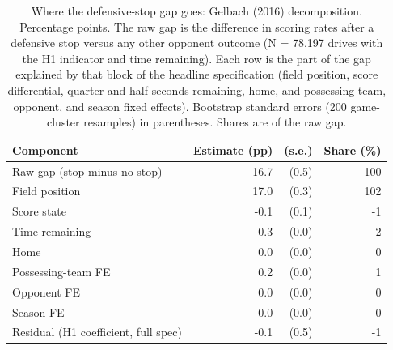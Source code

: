 \begin{table}[htbp]
\centering
\caption{\label{tab:decomp} Where the defensive-stop gap goes: Gelbach (2016) decomposition. Percentage points. The raw gap is the difference in scoring rates after a defensive stop versus any other opponent outcome (N = 78,197 drives with the H1 indicator and time remaining). Each row is the part of the gap explained by that block of the headline specification (field position, score differential, quarter and half-seconds remaining, home, and possessing-team, opponent, and season fixed effects). Bootstrap standard errors (200 game-cluster resamples) in parentheses. Shares are of the raw gap.}
\begin{tabular}{lrrr}
\toprule
Component & Estimate (pp) & (s.e.) & Share (\%) \\
\midrule
Raw gap (stop minus no stop) & 16.7 & (0.5) & 100 \\
\midrule
Field position & 17.0 & (0.3) & 102 \\
Score state & -0.1 & (0.1) & -1 \\
Time remaining & -0.3 & (0.0) & -2 \\
Home & 0.0 & (0.0) & 0 \\
Possessing-team FE & 0.2 & (0.0) & 1 \\
Opponent FE & 0.0 & (0.0) & 0 \\
Season FE & 0.0 & (0.0) & 0 \\
\midrule
Residual (H1 coefficient, full spec) & -0.1 & (0.5) & -1 \\
\bottomrule
\end{tabular}
\end{table}
